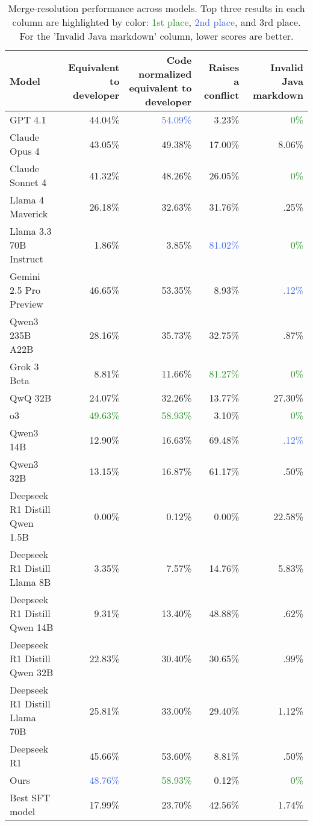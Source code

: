 \begin{table*}[ht]
\centering
\begin{tabular}{lrrrr}
\toprule
Model & Equivalent to developer & Code normalized equivalent to developer & Raises a conflict & Invalid Java markdown \\
\midrule
GPT 4.1 & 44.04\% & \textcolor{RoyalBlue}{54.09\%} & 3.23\% & \textcolor{ForestGreen}{0\%} \\
Claude Opus 4 & 43.05\% & 49.38\% & 17.00\% & 8.06\% \\
Claude Sonnet 4 & 41.32\% & 48.26\% & 26.05\% & \textcolor{ForestGreen}{0\%} \\
Llama 4 Maverick & 26.18\% & 32.63\% & 31.76\% & \textcolor{BurntOrange}{.25\%} \\
Llama 3.3 70B Instruct & 1.86\% & 3.85\% & \textcolor{RoyalBlue}{81.02\%} & \textcolor{ForestGreen}{0\%} \\
Gemini 2.5 Pro Preview & \textcolor{BurntOrange}{46.65\%} & 53.35\% & 8.93\% & \textcolor{RoyalBlue}{.12\%} \\
Qwen3 235B A22B & 28.16\% & 35.73\% & 32.75\% & .87\% \\
Grok 3 Beta & 8.81\% & 11.66\% & \textcolor{ForestGreen}{81.27\%} & \textcolor{ForestGreen}{0\%} \\
QwQ 32B & 24.07\% & 32.26\% & 13.77\% & 27.30\% \\
o3 & \textcolor{ForestGreen}{49.63\%} & \textcolor{ForestGreen}{58.93\%} & 3.10\% & \textcolor{ForestGreen}{0\%} \\
Qwen3 14B & 12.90\% & 16.63\% & \textcolor{BurntOrange}{69.48\%} & \textcolor{RoyalBlue}{.12\%} \\
Qwen3 32B & 13.15\% & 16.87\% & 61.17\% & .50\% \\
Deepseek R1 Distill Qwen 1.5B & 0.00\% & 0.12\% & 0.00\% & 22.58\% \\
Deepseek R1 Distill Llama 8B & 3.35\% & 7.57\% & 14.76\% & 5.83\% \\
Deepseek R1 Distill Qwen 14B & 9.31\% & 13.40\% & 48.88\% & .62\% \\
Deepseek R1 Distill Qwen 32B & 22.83\% & 30.40\% & 30.65\% & .99\% \\
Deepseek R1 Distill Llama 70B & 25.81\% & 33.00\% & 29.40\% & 1.12\% \\
Deepseek R1 & 45.66\% & \textcolor{BurntOrange}{53.60\%} & 8.81\% & .50\% \\
Ours & \textcolor{RoyalBlue}{48.76\%} & \textcolor{ForestGreen}{58.93\%} & 0.12\% & \textcolor{ForestGreen}{0\%} \\
Best SFT model & 17.99\% & 23.70\% & 42.56\% & 1.74\% \\
\bottomrule
\end{tabular}
\caption{Merge-resolution performance across models. Top three results in each column are highlighted by color: \textcolor{ForestGreen}{1st place}, \textcolor{RoyalBlue}{2nd place}, and \textcolor{BurntOrange}{3rd place}. For the 'Invalid Java markdown' column, lower scores are better.}
\end{table*}
